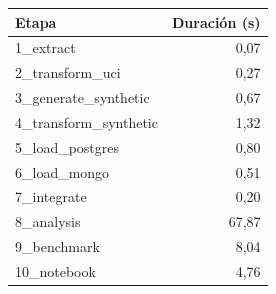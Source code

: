 \begin{tabular}{lr}
\toprule
Etapa & Duración (s) \\
\midrule
1\_extract & 0,07 \\
2\_transform\_uci & 0,27 \\
3\_generate\_synthetic & 0,67 \\
4\_transform\_synthetic & 1,32 \\
5\_load\_postgres & 0,80 \\
6\_load\_mongo & 0,51 \\
7\_integrate & 0,20 \\
8\_analysis & 67,87 \\
9\_benchmark & 8,04 \\
10\_notebook & 4,76 \\
\bottomrule
\end{tabular}
